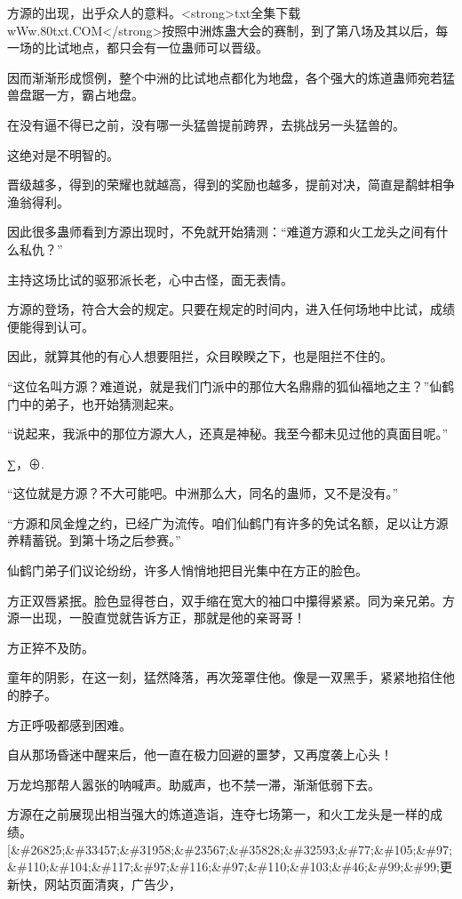 
\begin{this_body}

方源的出现，出乎众人的意料。<strong>txt全集下载wWw.80txt.COM</strong>按照中洲炼蛊大会的赛制，到了第八场及其以后，每一场的比试地点，都只会有一位蛊师可以晋级。

因而渐渐形成惯例，整个中洲的比试地点都化为地盘，各个强大的炼道蛊师宛若猛兽盘踞一方，霸占地盘。

在没有逼不得已之前，没有哪一头猛兽提前跨界，去挑战另一头猛兽的。

这绝对是不明智的。

晋级越多，得到的荣耀也就越高，得到的奖励也越多，提前对决，简直是鹬蚌相争渔翁得利。

因此很多蛊师看到方源出现时，不免就开始猜测：“难道方源和火工龙头之间有什么私仇？”

主持这场比试的驱邪派长老，心中古怪，面无表情。

方源的登场，符合大会的规定。只要在规定的时间内，进入任何场地中比试，成绩便能得到认可。

因此，就算其他的有心人想要阻拦，众目睽睽之下，也是阻拦不住的。

“这位名叫方源？难道说，就是我们门派中的那位大名鼎鼎的狐仙福地之主？”仙鹤门中的弟子，也开始猜测起来。

“说起来，我派中的那位方源大人，还真是神秘。我至今都未见过他的真面目呢。”

∑，⊕.

“这位就是方源？不大可能吧。中洲那么大，同名的蛊师，又不是没有。”

“方源和凤金煌之约，已经广为流传。咱们仙鹤门有许多的免试名额，足以让方源养精蓄锐。到第十场之后参赛。”

仙鹤门弟子们议论纷纷，许多人悄悄地把目光集中在方正的脸色。

方正双唇紧抿。脸色显得苍白，双手缩在宽大的袖口中攥得紧紧。同为亲兄弟。方源一出现，一股直觉就告诉方正，那就是他的亲哥哥！

方正猝不及防。

童年的阴影，在这一刻，猛然降落，再次笼罩住他。像是一双黑手，紧紧地掐住他的脖子。

方正呼吸都感到困难。

自从那场昏迷中醒来后，他一直在极力回避的噩梦，又再度袭上心头！

万龙坞那帮人嚣张的呐喊声。助威声，也不禁一滞，渐渐低弱下去。

方源在之前展现出相当强大的炼道造诣，连夺七场第一，和火工龙头是一样的成绩。[\&\#26825;\&\#33457;\&\#31958;\&\#23567;\&\#35828;\&\#32593;\&\#77;\&\#105;\&\#97;\&\#110;\&\#104;\&\#117;\&\#97;\&\#116;\&\#97;\&\#110;\&\#103;\&\#46;\&\#99;\&\#99;更新快，网站页面清爽，广告少，


\end{this_body}

